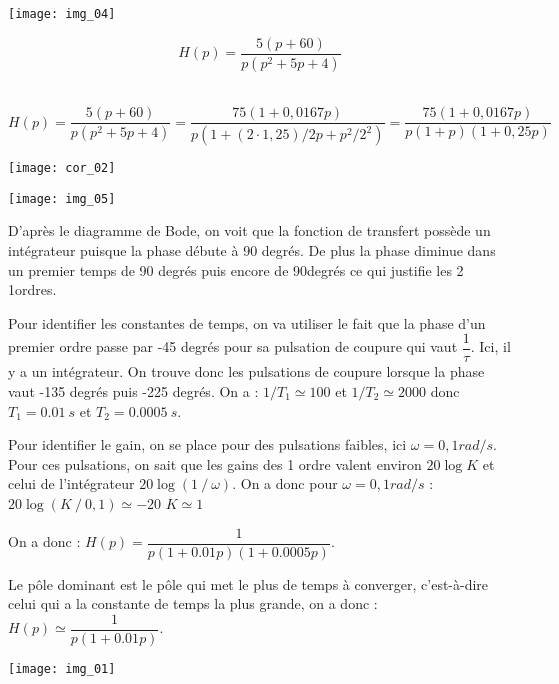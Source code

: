 \else
\begin{center}
\texttt{[image: img\_04]}
\end{center}
\fi

{}
$$
H(p)=\dfrac{5(p+60)}{p(p^2+5p+4)}
$$


\ifprof
\begin{corrige} ~\\

$H(p)=\dfrac{5(p+60)}{p(p^2+5p+4)} =\dfrac{75(1+0,0167p)}{p(1+(2\cdot 1,25)/2 p+p^2/2^2 )} =\dfrac{75(1+0,0167p)}{p(1+p)(1+0,25p)}
$
\end{corrige}
\begin{center}
\texttt{[image: cor\_02]}
\end{center}
\else
\begin{center}
\texttt{[image: img\_05]}
\end{center}\fi





\ifprof
\begin{corrige}
D’après le diagramme de Bode, on voit que la fonction de transfert possède un intégrateur puisque la phase débute à 90 degrés. De plus la phase diminue dans un premier temps de 90 degrés puis encore de 90degrés ce qui justifie les 2 1\ier ordres.

Pour identifier les constantes de temps, on va utiliser le fait que la phase d’un premier ordre passe par -45 degrés pour sa pulsation de coupure qui vaut $\dfrac{1}{\tau}$.
Ici, il y a un intégrateur. On trouve donc les pulsations de coupure lorsque la phase vaut -135 degrés puis -225 degrés. On a :
$1/T_1 \simeq 100$      et      $1/T_2 \simeq 2000$     donc    $T_1=\SI{0.01}{s}$ et
$T_2=\SI{0.0005}{s}$.

Pour identifier le gain, on se place pour des pulsations faibles, ici $\omega =0,1 rad/s$. Pour ces pulsations, on sait que les gains des 1\ier{} ordre valent environ $20\log K$ et celui de l’intégrateur $20\log(1⁄\omega)$. On a donc pour $\omega=0,1 rad/s$ :
$20 \log(K⁄0,1) \simeq -20 $  $K\simeq 1$

On a donc : $H(p)=\dfrac{1}{p(1+0.01p)(1+0.0005p)}$.

Le pôle dominant est le pôle qui met le plus de temps à converger, c’est-à-dire celui qui a la constante de temps la plus grande, on a donc :
$H(p)\simeq \dfrac{1}{p(1+0.01p)}$.
\end{corrige}
\else
\begin{center}
\texttt{[image: img\_01]}
\end{center}
\fi

